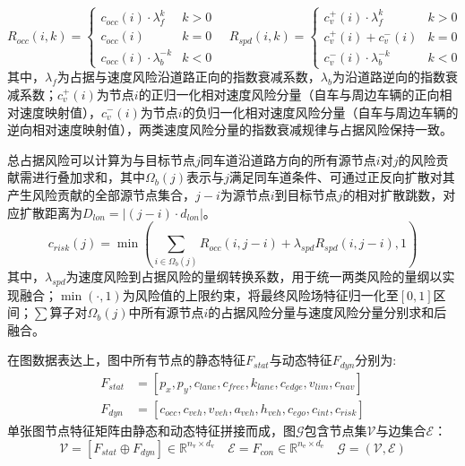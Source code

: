       \begin{equation}
      R_{occ}(i,k) = \begin{cases}c_{occ}(i)\cdot \lambda_f^{k} & k > 0\\ c_{occ}(i) & k = 0\\ c_{occ}(i)\cdot \lambda_b^{-k} & k < 0\end{cases} \quad
      R_{spd}(i,k) = \begin{cases} c_{v}^+(i)\cdot \lambda_f^{k} & k > 0\\ c_{v}^{+}(i) + c_{v}^{-}(i) & k = 0\\ c_{v}^-(i)\cdot \lambda_b^{-k} & k < 0\end{cases}
      \end{equation}
      \noindent 其中，$\lambda_f$为占据与速度风险沿道路正向的指数衰减系数，$\lambda_b$为沿道路逆向的指数衰减系数；$c_v^+(i)$为节点$i$的正归一化相对速度风险分量（自车与周边车辆的正向相对速度映射值），$c_v^-(i)$为节点$i$的负归一化相对速度风险分量（自车与周边车辆的逆向相对速度映射值），两类速度风险分量的指数衰减规律与占据风险保持一致。
      
      总占据风险可以计算为与目标节点$j$同车道沿道路方向的所有源节点$i$对$j$的风险贡献需进行叠加求和，其中$\Omega_b(j)$表示与$j$满足同车道条件、可通过正反向扩散对其产生风险贡献的全部源节点集合，$j-i$为源节点$i$到目标节点$j$的相对扩散跳数，对应扩散距离为$D_{lon}=|(j-i)\cdot d_{lon}|$。
      \begin{equation}
      c_{risk}(j) = \min(\sum_{i\in\Omega_b(j)}R_{occ}(i,j-i) + \lambda_{spd} R_{spd}(i,j-i),1)
      \end{equation}
      \noindent 其中，$\lambda_{spd}$为速度风险到占据风险的量纲转换系数，用于统一两类风险的量纲以实现融合；$\min(\cdot,1)$为风险值的上限约束，将最终风险场特征归一化至$[0,1]$区间；$\sum$算子对$\Omega_b(j)$中所有源节点$i$的占据风险分量与速度风险分量分别求和后融合。

      在图数据表达上，图中所有节点的静态特征$F_{stat}$与动态特征$F_{dyn}$分别为:
      \begin{equation}
      \begin{aligned}
      F_{stat}&= \left[p_x, p_y, c_{lane}, c_{free}, k_{lane}, c_{edge}, v_{lim}, c_{nav}\right]\\
        F_{dyn}&= \left[c_{occ}, c_{veh}, v_{veh}, a_{veh}, h_{veh}, c_{ego}, c_{int}, c_{risk}\right]
      \end{aligned}
      \end{equation}
      单张图节点特征矩阵由静态和动态特征拼接而成，图$\mathcal{G}$包含节点集$\mathcal{V}$与边集合$\mathcal{E}$：
      \begin{equation}\mathcal{V} = \left[F_{stat} \oplus F_{dyn}\right]\in \mathbb{R}^{n_\mathrm{v} \times d_\mathrm{v}} \quad \mathcal{E} = F_{con} \in \mathbb{R}^{n_\mathrm{e} \times d_\mathrm{e}} \quad \mathcal{G}=(\mathcal{V},\mathcal{E})\end{equation}
      


